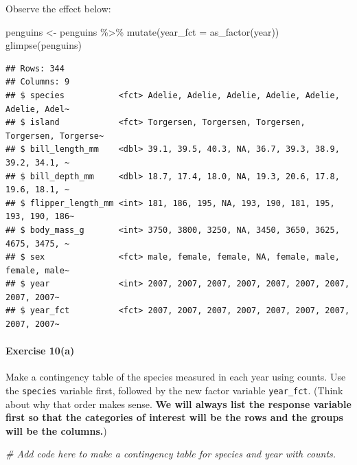 \documentclass[
]{book}
\newenvironment{Shaded}{\begin{snugshade}}{\end{snugshade}}
\newcommand{\AttributeTok}[1]{\textcolor[rgb]{0.77,0.63,0.00}{#1}}
\newcommand{\CommentTok}[1]{\textcolor[rgb]{0.56,0.35,0.01}{\textit{#1}}}
\newcommand{\FunctionTok}[1]{\textcolor[rgb]{0.00,0.00,0.00}{#1}}
\newcommand{\NormalTok}[1]{#1}
\newcommand{\OtherTok}[1]{\textcolor[rgb]{0.56,0.35,0.01}{#1}}
\newcommand{\SpecialCharTok}[1]{\textcolor[rgb]{0.00,0.00,0.00}{#1}}
\begin{document}
Observe the effect below:

\begin{Shaded}
\begin{Highlighting}[]
\NormalTok{penguins }\OtherTok{\textless{}{-}}\NormalTok{ penguins }\SpecialCharTok{\%\textgreater{}\%}
    \FunctionTok{mutate}\NormalTok{(}\AttributeTok{year\_fct =} \FunctionTok{as\_factor}\NormalTok{(year))}
\FunctionTok{glimpse}\NormalTok{(penguins)}
\end{Highlighting}
\end{Shaded}

\begin{verbatim}
## Rows: 344
## Columns: 9
## $ species           <fct> Adelie, Adelie, Adelie, Adelie, Adelie, Adelie, Adel~
## $ island            <fct> Torgersen, Torgersen, Torgersen, Torgersen, Torgerse~
## $ bill_length_mm    <dbl> 39.1, 39.5, 40.3, NA, 36.7, 39.3, 38.9, 39.2, 34.1, ~
## $ bill_depth_mm     <dbl> 18.7, 17.4, 18.0, NA, 19.3, 20.6, 17.8, 19.6, 18.1, ~
## $ flipper_length_mm <int> 181, 186, 195, NA, 193, 190, 181, 195, 193, 190, 186~
## $ body_mass_g       <int> 3750, 3800, 3250, NA, 3450, 3650, 3625, 4675, 3475, ~
## $ sex               <fct> male, female, female, NA, female, male, female, male~
## $ year              <int> 2007, 2007, 2007, 2007, 2007, 2007, 2007, 2007, 2007~
## $ year_fct          <fct> 2007, 2007, 2007, 2007, 2007, 2007, 2007, 2007, 2007~
\end{verbatim}

\hypertarget{exercise-10a}{%
\paragraph*{Exercise 10(a)}\label{exercise-10a}}

Make a contingency table of the species measured in each year using counts. Use the \texttt{species} variable first, followed by the new factor variable \texttt{year\_fct}. (Think about why that order makes sense. \textbf{We will always list the response variable first so that the categories of interest will be the rows and the groups will be the columns.})

\begin{Shaded}
\begin{Highlighting}[]
\CommentTok{\# Add code here to make a contingency table for species and year with counts.}
\end{Highlighting}
\end{Shaded}
\end{document}
